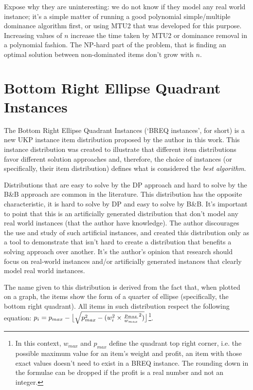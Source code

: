 Expose why they are uninteresting: we do not know if they model any real world instance; it's a simple matter of running a good polynomial simple/multiple dominance algorithm first, or using MTU2 that was developed for this purpose. Increasing values of \(n\) increase the time taken by MTU2 or dominance removal in a polynomial fashion. The NP-hard part of the problem, that is finding an optimal solution between non-dominated items don't grow with \(n\). %

\section{Bottom Right Ellipse Quadrant Instances}

The Bottom Right Ellipse Quadrant Instances (`BREQ instances', for short) is a new UKP instance item distribution proposed by the author in this work. This instance distribution was created to illustrate that different item distributions favor different solution approaches and, therefore, the choice of instances (or specifically, their item distribution) defines what is considered the \emph{best algorithm}.

Distributions that are easy to solve by the DP approach and hard to solve by the B\&B approach are common in the literature. This distribution has the opposite characteristic, it is hard to solve by DP and easy to solve by B\&B. It's important to point that this is an artificially generated distribution that don't model any real world instances (that the author have knowledge). The author discourages the use and study of such artificial instances, and created this distribution only as a tool to demonstrate that isn't hard to create a distribution that benefits a solving approach over another. It's the author's opinion that research should focus on real-world instances and/or artificially generated instances that clearly model real world instances.

The name given to this distribution is derived from the fact that, when plotted on a graph, the items show the form of a quarter of ellipse (specifically, the bottom right quadrant). All items in such distribution respect the following equation: \(p_i = p_{max} - \floor[\big]{\sqrt{p_{max}^2 - (w_i^2 \times \frac{p_{max}}{w_{max}}^2)}}\)\footnote{In this context, \(w_{max}\) and \(p_{max}\) define the quadrant top right corner, i.e. the possible maximum value for an item's weight and profit, an item with those exact values doesn't need to exist in a BREQ instance. The rounding down in the formulae can be dropped if the profit is a real number and not an integer.}.

